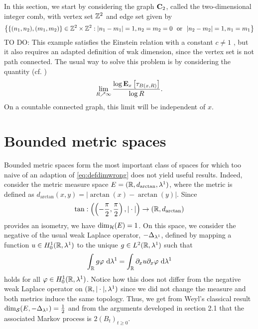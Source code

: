 In this section, we start by considering the graph $\bC_2$, called the two-dimensional integer comb, with vertex set $\IZ^2$ and edge set given by
\[
  \left\{\{(n_1,n_2),(m_1,m_2)\}\in\IZ^2\times\IZ^2:|n_1-m_1|=1,n_2=m_2=0\ \text{ or }\ |n_2-m_2|=1,n_1=m_1\right\}
\]
TO DO: This example satisfies the Einstein relation with a constant $c\neq1$ \cite{bertacchi2006}, but it also requires an adapted definition of wak dimension, since the vertex set is not path connected. The usual way to solve this problem is by considering the quantity (cf. \cite{freiberg2012einstein})
\begin{equation}\label{eq:defdimwrong}
  \lim_{R\nearrow\infty}\frac{\log \PTEp{\tau_{B(x,R)}}{x}}{\log R}.
\end{equation}
On a countable connected graph, this limit will be independent of $x$. 


\section{Bounded metric spaces}

Bounded metric spaces form the most important class of spaces for which too naive of an adaption of \eqref{eq:defdimwrong} does not yield useful results. Indeed, consider the metric measure space 
$E=(\IR,d_{\arctan},\gl^1)$, where the metric is defined as $d_{\arctan}(x,y)=|\arctan(x)-\arctan(y)|$. Since 
\[
  \tan:\left(\left(-\frac{\pi}{2},\frac{\pi}{2}\right),|\cdot|\right)\to(\IR,d_{\arctan}) 
\]
provides an isometry, we have $\dimh(E)=1$. On this space, we consider the negative of the usual weak Laplace operator, $-\gD_{\gl^1}$, defined by mapping a function $u\in H_0^1(\IR,\gl^1)$ to the unique $g\in L^2(\IR,\gl^1)$ such that
\[
  \int_\IR g\gp\,\Di\gl^1=\int_\IR \partial_x u\partial_x \gp\,\Di\gl^1
\]
holds for all $\gp\in H_0^1(\IR,\gl^1)$. Notice how this does not differ from the negative weak Laplace operator on $(\IR,|\cdot|,\gl^1)$ since we did not change the measure and both metrics induce the same topology. Thus, we get from Weyl's classical result $\dims(E,-\gD_{\gl^1})=\frac{1}{2}$ and from the arguments developed in section 2.1 that the associated Markov process is $2(B_t)_{t\geq0}$. 


